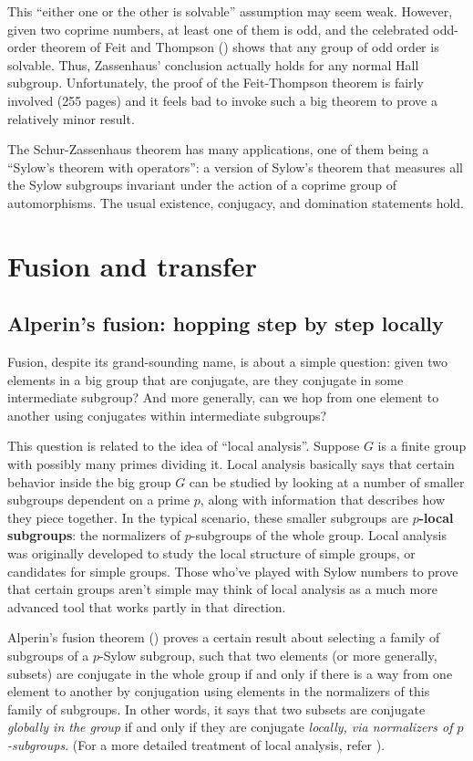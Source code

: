 \documentclass{amsart}
\renewcommand{\definedind}[1]{{\bf #1}}
\begin{document}
This ``either one or the other is solvable'' assumption may seem
weak. However, given two coprime numbers, at least one of them is odd,
and the celebrated odd-order theorem of Feit and Thompson
(\cite{feitthompson}) shows that any group of odd order is
solvable. Thus, Zassenhaus' conclusion actually holds for any normal
Hall subgroup. Unfortunately, the proof of the Feit-Thompson theorem
is fairly involved (255 pages) and it feels bad to invoke such a big
theorem to prove a relatively minor result.

The Schur-Zassenhaus theorem has many applications, one of them being
a ``Sylow's theorem with operators'': a version of Sylow's theorem
that measures all the Sylow subgroups invariant under the action of a
coprime group of automorphisms. The usual existence, conjugacy, and
domination statements hold.

\section{Fusion and transfer}

\subsection{Alperin's fusion: hopping step by step locally}\label{fusion}

Fusion, despite its grand-sounding name, is about a simple question:
given two elements in a big group that are conjugate, are they
conjugate in some intermediate subgroup?  And more generally, can we
hop from one element to another using conjugates within intermediate
subgroups?

This question is related to the idea of ``local analysis''. Suppose
$G$ is a finite group with possibly many primes dividing it. Local
analysis basically says that certain behavior inside the big group $G$
can be studied by looking at a number of smaller subgroups dependent
on a prime $p$, along with information that describes how they piece
together. In the typical scenario, these smaller subgroups are
\definedind{$p$-local subgroups}: the normalizers of $p$-subgroups of
the whole group. Local analysis was originally developed to study the
local structure of simple groups, or candidates for simple
groups. Those who've played with Sylow numbers to prove that certain
groups aren't simple may think of local analysis as a much more
advanced tool that works partly in that direction.

Alperin's fusion theorem (\cite{alperinfusion}) proves a certain
result about selecting a family of subgroups of a $p$-Sylow subgroup,
such that two elements (or more generally, subsets) are conjugate in
the whole group if and only if there is a way from one element to
another by conjugation using elements in the normalizers of this
family of subgroups. In other words, it says that two subsets are
conjugate {\em globally in the group} if and only if they are
conjugate {\em locally, via normalizers of $p$-subgroups}. (For a more
detailed treatment of local analysis, refer \cite[Chapter 1]{GL}).
\end{document}
